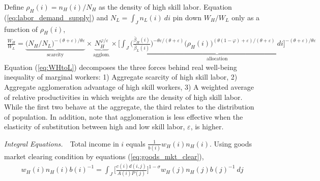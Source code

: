 \documentclass{article}
\begin{document}
Define $\rho_H(i) = n_H(i)/N_H$ as the density of high skill labor. Equation (\ref{eq:labor_demand_supply}) and $ N_L = \int_J n_L(i)~di $ pin down $W_H/W_L$ only as a function of $\rho_H(i)$,
\begin{eqnarray}\label{eq:WHtoL}
\frac{W_H}{W_L} =
\underbrace{\Big(N_H/N_L\Big)^{-(\theta+ \varepsilon)/\theta\varepsilon}}_{\mbox{scarcity}} \times \underbrace{N_H^{\varphi/\varepsilon}}_{\mbox{agglom.}} 
\times
\underbrace{\Bigg[ \int_J \Big( \frac{\bar{\beta}_H(i)}{\bar{\beta}_L(i)} \Big)^{-\theta\varepsilon/(\theta+\varepsilon)} \Big( \rho_H(i) \Big)^{(\theta(1-\varphi)+\varepsilon)/(\theta+\varepsilon)}~di \Bigg]^{-(\theta+ \varepsilon)/\theta\varepsilon}}_{\mbox{allocation}} 
\end{eqnarray}
Equation (\ref{eq:WHtoL}) decomposes the three forces behind real well-being inequality of marginal workers: 1) Aggregate scarcity of high skill labor, 2) Aggregate agglomeration advantage of high skill workers, 3) A weighted average of relative productivities in which weights are the density of high skill labor. While the  first two behave at the aggregate, the third relates to the distribution of population. In addition, note that agglomeration is less effective when the elasticity of substitution between high and low skill labor, $\varepsilon$, is higher.

\textit{Integral Equations.}~~Total income in $i$ equals
$\frac{1}{b(i)} w_H(i)n_H(i)$. Using goods market clearing condition by equations (\ref{eq:goods_mkt_clear}), 
\begin{eqnarray}
	w_H(i) n_H(i) b(i)^{-1} = 
	\int_J \Big[ \frac{c(i) d(i,j)}{A(i) P(j)} \Big]^{1-\sigma} w_H(j) n_H(j) b(j)^{-1} ~dj \nonumber
\end{eqnarray}
\end{document}
